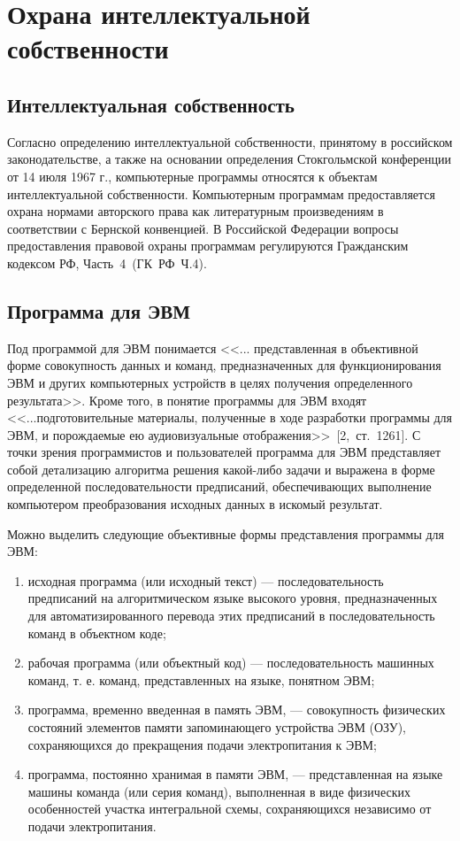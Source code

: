 \chapter{Охрана интеллектуальной собственности}

\section{Интеллектуальная собственность}

Согласно определению интеллектуальной собственности, принятому в российском законодательстве,
а также на основании определения Стокгольмской конференции от 14 июля 1967 г., компьютерные программы
относятся к объектам интеллектуальной собственности. Компьютерным программам предоставляется охрана
нормами авторского права как литературным произведениям в соответствии с Бернской конвенцией.
В Российской Федерации вопросы предоставления правовой охраны программам регулируются Гражданским
кодексом РФ, Часть~4~(ГК~РФ~Ч.4).

\section{Программа для ЭВМ}

Под программой для ЭВМ понимается <<... представленная в объективной форме совокупность данных и команд,
предназначенных для функционирования ЭВМ и других компьютерных устройств в целях получения определенного
результата>>. Кроме того, в понятие программы для ЭВМ входят <<...подготовительные материалы, полученные
в ходе разработки программы для ЭВМ, и порождаемые ею аудиовизуальные отображения>>~[2,~ст.~1261].
С точки зрения программистов и пользователей программа для ЭВМ представляет собой детализацию алгоритма
решения какой-либо задачи и выражена в форме определенной последовательности предписаний, обеспечивающих
выполнение компьютером преобразования исходных данных в искомый результат.

Можно выделить следующие объективные формы представления программы для ЭВМ:
\begin{enumerate}
\item исходная программа (или исходный текст) --- последовательность предписаний на алгоритмическом языке
высокого уровня, предназначенных для автоматизированного перевода этих предписаний в последовательность команд
в объектном коде;
\item рабочая программа (или объектный код) --- последовательность машинных команд, т. е. команд, представленных
на языке, понятном ЭВМ;
\item программа, временно введенная в память ЭВМ, --- совокупность физических состояний элементов памяти
запоминающего устройства ЭВМ (ОЗУ), сохраняющихся до прекращения подачи электропитания к ЭВМ;
\item программа, постоянно хранимая в памяти ЭВМ, --- представленная на языке машины команда (или серия команд),
выполненная в виде физических особенностей участка интегральной схемы, сохраняющихся независимо от подачи
электропитания.
\end{enumerate}

